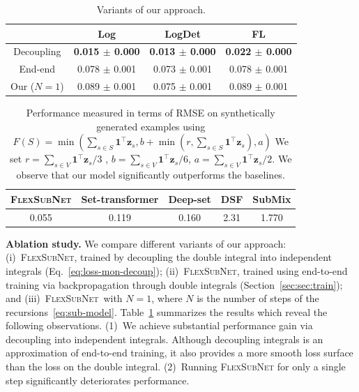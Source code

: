 \documentclass{article}
\newcommand{\our}{\textsc{Flex\-Sub\-Net}}
\newcommand{\xhdr}[1]{\noindent\textbf{#1.}}
\newcommand{\best}{\textbf}
\newcommand{\deepset}{Deep-set}
\newcommand{\settx}{Set-transformer}
\begin{document}
\begin{table}[h]
\centering
\small
\begin{tabular}{c||c|c|c}
\hline 
& Log    & LogDet     & FL    \\ \hline        
Decoupling & \best{0.015 $\pm$ 0.000} & \best{0.013 $\pm$ 0.000} & \best{0.022 $\pm$ 0.000} \\
End-end &{0.078 $\pm$ 0.001} & {0.073 $\pm$ 0.001} & {0.078 $\pm$ 0.001} \\
Our ($N=1$) &{0.089 $\pm$ 0.001} & {0.075 $\pm$ 0.001} & {0.089 $\pm$ 0.001}
\\ \hline 
\end{tabular}
\caption{Variants of our approach.
}
\label{tab:training}
\end{table}
\begin{table}[h]
\centering
\small
    \begin{tabular}{c|c|c|c|c}
    \hline
        \our & \settx & \deepset & DSF & SubMix \\ \hline
        0.055 & 0.119 & 0.160 & 2.31 & 1.770 \\ \hline
    \end{tabular}
\caption{Performance measured in terms of RMSE on synthetically generated examples using $F(S) = \min(\sum_{s\in S} \pmb{1}^{\top} \pmb{z}_s,  b+\min(r , \sum_{s\in S}\pmb{1}^{\top} \pmb{z}_s),a)$
We set $r = \sum_{s\in V} \pmb{1}^{\top} \pmb{z}_s / 3$ ,  $b =  \sum_{s\in V} \pmb{1}^{\top} \pmb{z}_s / 6$, $a =   \sum_{s\in V} \pmb{1}^{\top} \pmb{z}_s / 2$. We observe that our model significantly outperforms the baselines.
}\label{tab:reb}
\end{table}

\xhdr{Ablation study} We compare different variants of our approach: (i)~\our, trained by decoupling the double integral into independent integrals (Eq.~\eqref{eq:loss-mon-decoup}); (ii)~\our, trained using  end-to-end training via backpropagation  through double integrals (Section~\ref{sec:sec:train}); and 
(iii)~\our\ with $N=1$, where $N$ is the number of steps of the recursions~\eqref{eq:sub-model}. Table~\ref{tab:training} summarizes the results which reveal the following observations. (1)~We achieve substantial performance gain via decoupling into independent integrals. Although decoupling integrals is an approximation of end-to-end training, it also provides a more smooth loss surface than the loss on the double integral. (2)~Running \our{} for only a single step significantly deteriorates  performance.
\end{document}
